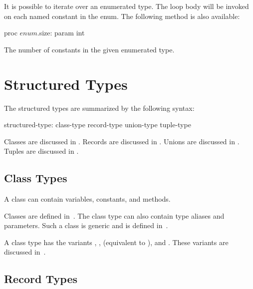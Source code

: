 It is possible to iterate over an enumerated type. The loop body will be
invoked on each named constant in the enum.
The following method is also available:

\begin{protohead}
proc $enum$.size: param int
\end{protohead}
\begin{protobody}
The number of constants in the given enumerated type.
\end{protobody}

\clearpage
\section{Structured Types}
\label{Structured_Types}

The structured types are summarized by the following syntax:

\begin{syntax}
structured-type:
  class-type
  record-type
  union-type
  tuple-type
\end{syntax}

Classes are discussed in .  Records are discussed
in .  Unions are discussed in .  Tuples are
discussed in .

\subsection{Class Types}
\label{Types_Class_Types}

A class can contain variables, constants, and methods.

Classes are defined
in~.  The class type can also contain type aliases and
parameters.  Such a class is generic and is defined
in~.

A class type  has the variants , ,
 (equivalent to ), and . These
variants are discussed in~.

\subsection{Record Types}
\label{Types_Record_Types}

